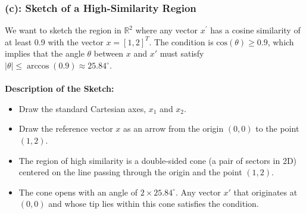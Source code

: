 \documentclass{article}
\begin{document}
\begin{center}
\end{center}

\subsubsection*{(c): Sketch of a High-Similarity Region}
\parbox{\textwidth}{
We want to sketch the region in $\mathbb{R}^2$ where any vector $x^{\prime}$ has a cosine similarity of at least 0.9 with the vector $x = [1, 2]^T$. The condition is $\text{cos}(\theta) \ge 0.9$, which implies that the angle $\theta$ between $x$ and $x'$ must satisfy $|\theta| \le \arccos(0.9) \approx 25.84^\circ$.
\\~\\
\textbf{Description of the Sketch:}
\begin{itemize}
    \item Draw the standard Cartesian axes, $x_1$ and $x_2$.
    \item Draw the reference vector $x$ as an arrow from the origin $(0,0)$ to the point $(1,2)$.
    \item The region of high similarity is a double-sided cone (a pair of sectors in 2D) centered on the line passing through the origin and the point $(1,2)$.
    \item The cone opens with an angle of $2 \times 25.84^\circ$. Any vector $x'$ that originates at $(0,0)$ and whose tip lies within this cone satisfies the condition.
\end{itemize}
}
\end{document}
